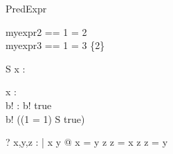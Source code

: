 \begin{zsection}
  \SECTION PredExpr
\end{zsection}

\begin{zed}
  myexpr2 == 1 = 2\\
  myexpr3 == 1 = 3 \in \{2\}\\
\end{zed}

\begin{schema}{S}
  x : \nat
\end{schema}

\begin{axdef}
   x : \nat\\
   b! : \bool
\where
   b! \iff true\\
   b! \iff ((1 = 1) \implies S \implies true)\\
\end{axdef}

\begin{zed}
  \vdash? \forall x,y,z : \bool | x \land \lnot y @
       x = y \land z \iff z = x \land \lnot z \iff z = y
\end{zed}
